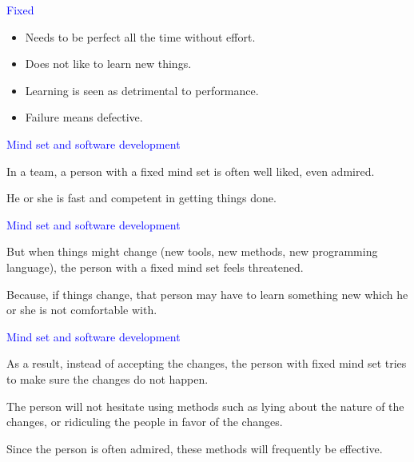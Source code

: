 \documentclass{slides}
\newcommand{\ti}[1]{\begin{center}\Large{\textcolor{blue}{#1}}\end{center}}
\begin{document}
\begin{slide}\ti{Fixed}

  \begin{itemize}
  \item Needs to be perfect all the time without effort.
  \item Does not like to learn new things.
  \item Learning is seen as detrimental to performance.
  \item Failure means defective.
  \end{itemize}

\vfill\end{slide}
\begin{slide}\ti{Mind set and software development}

In a team, a person with a fixed mind set is often well liked,
even admired.

He or she is fast and competent in getting things done.

\vfill\end{slide}
\begin{slide}\ti{Mind set and software development}

But when things might change (new tools, new methods, new programming
language), the person with a fixed mind set feels threatened.

Because, if things change, that person may have to learn something new
which he or she is not comfortable with.

\vfill\end{slide}
\begin{slide}\ti{Mind set and software development}

As a result, instead of accepting the changes, the person with fixed
mind set tries to make sure the changes do not happen.

The person will not hesitate using methods such as lying about the
nature of the changes, or ridiculing the people in favor of the
changes.

Since the person is often admired, these methods will frequently be
effective.

\vfill\end{slide}
\end{document}
